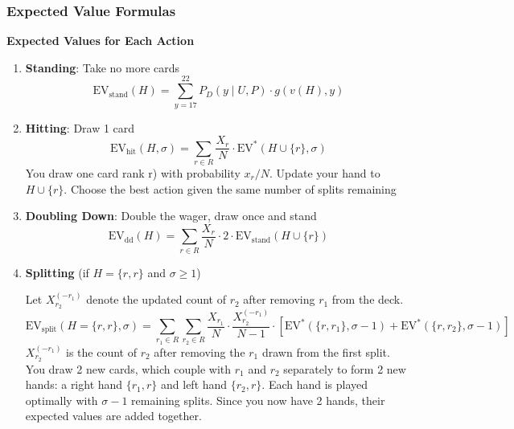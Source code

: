 \documentclass[12pt,a4paper]{cibb}
\begin{document}
\subsubsection*{Expected Value Formulas}

\textbf{Expected Values for Each Action}

\begin{enumerate}
    \item \textbf{Standing}: Take no more cards
    \begin{equation}
        \mathrm{EV}_{\text{stand}}(H) = \sum_{y=17}^{22} P_D(y \mid U, P) \cdot g(v(H), y)
        \label{eq:EV_STAND}
    \end{equation}

    \item \textbf{Hitting}: Draw 1 card
    \begin{equation}
          \mathrm{EV}_{\text{hit}}(H, σ  ) = \sum_{r \in R} \frac{X_r}{N} \cdot \mathrm{EV}^*(H \cup \{r\}, σ  )
        \label{eq:EV_HIT}
    \end{equation}
You draw one card rank r) with probability \(x_r/N\).
Update your hand to \(H \cup \{r\}\). Choose the best action given the same number of splits remaining

    \item \textbf{Doubling Down}: Double the wager, draw once and stand
    \begin{equation}
        \mathrm{EV}_{\text{dd}}(H) = \sum_{r \in R} \frac{X_r}{N} \cdot 2 \cdot \mathrm{EV}_{\text{stand}}(H \cup \{r\})
        \label{eq:EV_DOUBLE}
    \end{equation}

\item \textbf{Splitting} (if $H = \{r, r\}$ and $\sigma \geq 1$)

  Let $X_{r_2}^{(-r_1)}$ denote the updated count of $r_2$ after removing $r_1$ from the deck.
  \begin{equation}
    \mathrm{EV}_{\text{split}}(H = \{r, r\}, \sigma ) = \sum_{r_1 \in R} \sum_{r_2 \in R} \frac{X_{r_1}}{N} \cdot \frac{X_{r_2}^{(-r_1)}}{N - 1} \cdot \left[ \mathrm{EV}^*(\{r, r_1\}, \sigma - 1) + \mathrm{EV}^*(\{r, r_2\}, \sigma - 1) \right]
    \label{eq:EV_SPLIT}
  \end{equation}
  $X_{r_2}^{(-r_1)}$ is the count of $r_2$ after removing the $r_1$ drawn from the first split.
  You draw 2 new cards, which couple with $r_1$ and $r_2$ separately to form 2 new hands: a right hand $\{r_1, r\}$ and left hand $\{r_2, r\}$.
  Each hand is played optimally with $\sigma - 1$ remaining splits. Since you now have 2 hands, their expected values are added together.
\end{enumerate}
\end{document}
